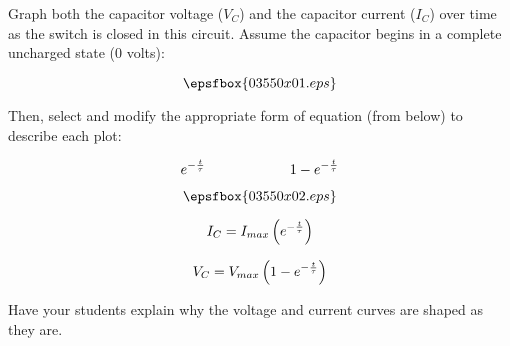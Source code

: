 

Graph both the capacitor voltage ($V_C$) and the capacitor current ($I_C$) over time as the switch is closed in this circuit.  Assume the capacitor begins in a complete uncharged state (0 volts):

$$\epsfbox{03550x01.eps}$$

Then, select and modify the appropriate form of equation (from below) to describe each plot:

$$e^{-{t \over \tau}} \hbox{\hskip 60pt} 1 - e^{-{t \over \tau}}$$







$$\epsfbox{03550x02.eps}$$

$$I_C = I_{max} \left(e^{-{t \over \tau}}\right)$$

$$V_C = V_{max} \left(1 - e^{-{t \over \tau}}\right)$$







Have your students explain why the voltage and current curves are shaped as they are.




